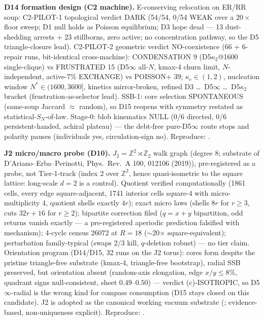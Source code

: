 \documentclass[11pt]{article}
\begin{document}
\textbf{D14 formation design (C2 machine).} E-conserving relocation on ER/RR
soup: C2-PILOT-1 topological verdict DARK (54/54, 0/54 WEAK over a $20\times$
floor sweep; D1 null holds as Poisson equilibrium; D3 hope dead --- 13
dust-shedding arrests + 23 stillborns, zero active; no concentration pathway,
so the D5 triangle-closure lead). C2-PILOT-2 geometric verdict NO-coexistence
(66 + 6-repair runs, bit-identical cross-machine): CONDENSATION 9
(D5$\kappa_2$@1600 single-clique) vs FRUSTRATED 15 (D5$\infty$ all-$N$,
kmax-4 churn limit, $N$-independent, active-7\% EXCHANGE) vs POISSON+ 39;
$\kappa_c \in (1,2)$, nucleation window $N^* \in (1600,3600]$, kinetics
mirror-broken, refined D3 \dots\ D5$\infty$ \dots\ D5$\kappa_2$ bracket
(frustration-as-selector lead). SSB-1: core selection SPONTANEOUS (same-soup
Jaccard $\approx$ random), so D15 reopens with symmetry restated as
statistical-$S_N$-of-law. Stage-0: blob kinematics NULL (0/6 directed, 0/6
persistent-handed, achiral plateau) --- the debt-free pure-D5$\infty$ route
stops and polarity pauses (individuals yes, circulation-sign no).
Reproduce: .

\textbf{J2 micro/macro probe (D10).} $J_2 = \mathbb{Z}^2 \rtimes
\mathbb{Z}_2$ walk graph (degree 8; substrate of
D'Ariano--Erba--Perinotti, Phys.\ Rev.\ A 100, 012106 (2019)),
pre-registered as a probe, not Tier-1-track (index 2 over
$\mathbb{Z}^2$, hence quasi-isometric to the square lattice:
long-scale $d{=}2$ is a control). Quotient verified computationally
(1861 cells, every edge square-adjacent, 1741 interior cells square-4
with micro-multiplicity 4, quotient shells exactly $4r$); exact micro
laws (shells $8r$ for $r \ge 3$, cuts $32r{+}16$ for $r \ge 2$);
bipartite correction filed ($q{=}x{+}y$ bipartition, odd returns vanish
exactly --- a pre-registered aperiodic prediction falsified with
mechanism); 4-cycle census $26072$ at $R{=}18$ ($\sim$20$\times$
square-equivalent); perturbation family-typical (swaps $2/3$ kill,
$q$-deletion robust) --- no tier claim. Orientation program (D14/D15,
32 runs on the J2 torus): cores form despite the pristine triangle-free
substrate (kmax-4, triangle-free bootstrap), radial SSB preserved, but
orientation absent (random-axis elongation, edge $x/y \le 8\%$, quadrant
signs null-consistent, sheet $0.49$--$0.50$) --- verdict (c)-ISOTROPIC,
so D5$\infty$-radial is the wrong kind for compass consumption (D15 stays
closed on this candidate). J2 is adopted as the canonical working vacuum
substrate (; evidence-based, non-uniqueness explicit).
Reproduce: .
\end{document}
